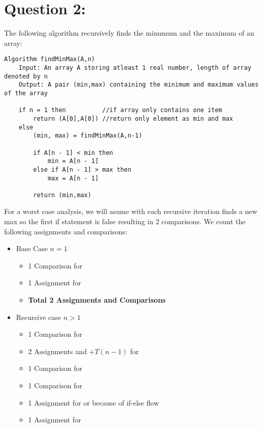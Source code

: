 \documentclass{article}
\begin{document}
\section*{Question 2:}
The following algorithm recursively finds the minumum and the maximum of an array:
\begin{lstlisting}
Algorithm findMinMax(A,n)
    Input: An array A storing atleast 1 real number, length of array denoted by n 
    Output: A pair (min,max) containing the minimum and maximum values of the array

    if n = 1 then          //if array only contains one item
        return (A[0],A[0]) //return only element as min and max
    else
        (min, max) = findMinMax(A,n-1)

        if A[n - 1] < min then
            min = A[n - 1]  
        else if A[n - 1] > max then
            max = A[n - 1]  

        return (min,max)
\end{lstlisting}
For a worst case analysis, we will asume with each recursive iteration finds a new max so the first if statement is false resulting in 2 comparisons. We count the following assignments and comparisons:
\begin{itemize}
    \item Base Case $n=1$
    \begin{itemize}
        \item 1 Comparison for 
        \item 1 Assignment for 
        \item \textbf{Total 2 Assignments and Comparisons}
    \end{itemize}
    \item Recursive case $n>1$
    \begin{itemize}
        \item 1 Comparison for 
        \item 2 Assignments and $+T(n-1)$ for 
        \item 1 Comparison for 
        \item 1 Comparison for 
        \item 1 Assignment for  or  because of if-else flow
        \item 1 Assignment for 
    \end{itemize}
\end{itemize}
\end{document}
